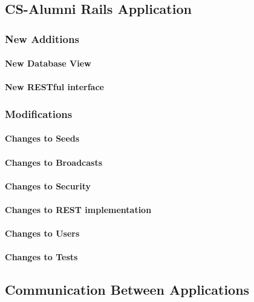 \documentclass{article}
\begin{document}
\subsection{CS-Alumni Rails Application}

\subsubsection{New Additions}

\paragraph{New Database View}

\paragraph{New RESTful interface}

\subsubsection{Modifications}

\paragraph{Changes to Seeds}

\paragraph{Changes to Broadcasts}

\paragraph{Changes to Security}

\paragraph{Changes to REST implementation}

\paragraph{Changes to Users}

\paragraph{Changes to Tests}

\subsection{Communication Between Applications}
\end{document}

